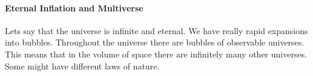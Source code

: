 \documentclass{article}
\begin{document}
\paragraph{Eternal Inflation and Multiverse}
\label{par:eternal_inflation_and_multiverse}
Lets say that the universe is infinite and eternal. We have really rapid expansions into bubbles. Throughout the universe there are bubbles of observable universes. This means that in the volume of space there are infinitely many other universes. Some might have different laws of nature.
\end{document}
